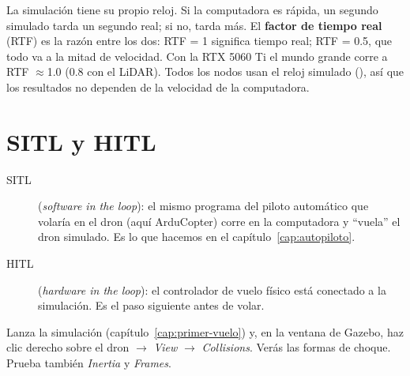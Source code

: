 La simulación tiene su propio reloj. Si la computadora es rápida, un segundo simulado tarda un segundo
real; si no, tarda más. El \textbf{factor de tiempo real} (RTF) es la razón entre los dos: RTF = 1
significa tiempo real; RTF = 0.5, que todo va a la mitad de velocidad. Con la RTX 5060 Ti el mundo
grande corre a RTF $\approx$1.0 (0.8 con el LiDAR). Todos los nodos usan el reloj simulado
(), así que los resultados no dependen de la velocidad de la computadora.

\section{SITL y HITL}

\begin{description}
  \item[SITL] (\emph{software in the loop}): el mismo programa del piloto automático que volaría en el
        dron (aquí ArduCopter) corre en la computadora y ``vuela'' el dron simulado. Es lo que hacemos
        en el capítulo~\ref{cap:autopiloto}.
  \item[HITL] (\emph{hardware in the loop}): el controlador de vuelo físico está conectado a la
        simulación. Es el paso siguiente antes de volar.
\end{description}

\begin{ejercicio}
Lanza la simulación (capítulo~\ref{cap:primer-vuelo}) y, en la ventana de Gazebo, haz clic derecho
sobre el dron $\rightarrow$ \emph{View} $\rightarrow$ \emph{Collisions}. Verás las formas de choque.
Prueba también \emph{Inertia} y \emph{Frames}.
\end{ejercicio}
